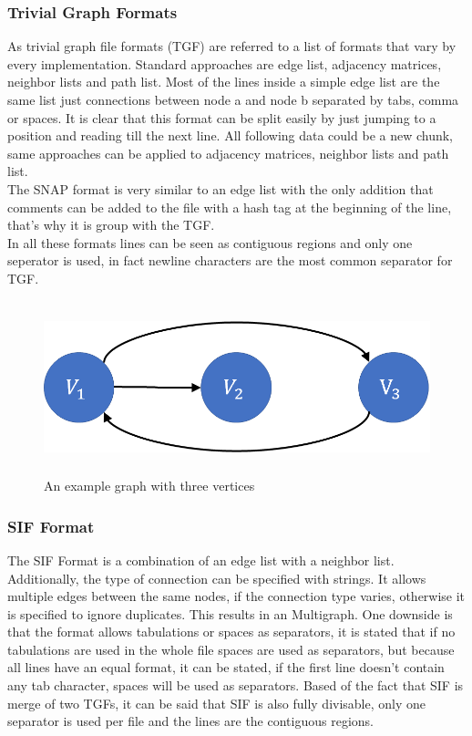 \subsubsection{Trivial Graph Formats}
As trivial graph file formats (TGF) are referred to a list of formats that vary by every implementation. Standard approaches are edge list, adjacency matrices, neighbor lists and path list.
Most of the lines inside a simple edge list are the same list just connections between node a and node b separated by tabs, comma or spaces. It is clear that this format can be split easily by just jumping to a position and reading till the next line. All following data could be a new chunk, same approaches can be applied to adjacency matrices, neighbor lists and path list.\\
The SNAP format is very similar to an edge list with the only addition that comments can be added to the file with a hash tag at the beginning of the line, that’s why it is group with the TGF.\\
In all these formats lines can be seen as contiguous regions and only one seperator is used, in fact newline characters are the most common separator for TGF. \cite{Roughan.10.03.2015}

\begin{figure}[H]
	\centering
	\includegraphics[height=5cm]{img/simple.png}
	\caption{An example graph with three vertices}
	\label{simple}
\end{figure}

\subsubsection{SIF Format}
The SIF Format is a combination of an edge list with a neighbor list. Additionally, the type of connection can be specified with strings. It allows multiple edges between the same nodes, if the connection type varies, otherwise it is specified to ignore duplicates. This results in an Multigraph. One downside is that the format allows tabulations or spaces as separators, it is stated that if no tabulations are used in the whole file spaces are used as separators, but because all lines have an equal format, it can be stated, if the first line doesn’t contain any tab character, spaces will be used as separators. Based of the fact that SIF is merge of two TGFs, it can be said that SIF is also fully divisable, only one separator is used per file and the lines are the contiguous regions. \cite{TheCytoscapeConsortium.2017}


